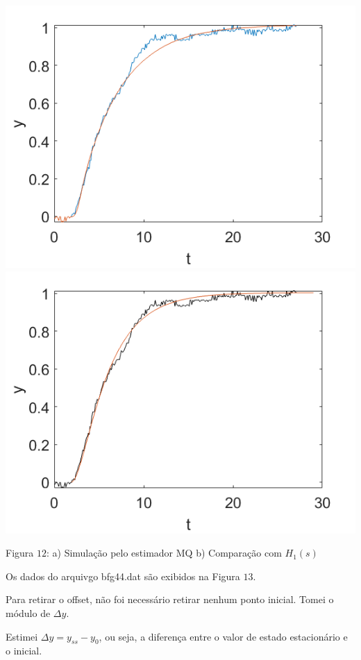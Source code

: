 \documentclass{rbfin}
\begin{document}
\begin{center}
\includegraphics[scale=0.5]{33_4}
\includegraphics[scale=0.5]{33_5}

Figura $12$: a) Simulação pelo estimador MQ b) Comparação com $H_1(s)$
\end{center}

\dotfill

\newpage

Os dados do arquivgo bfg44.dat são exibidos na Figura $13$.

Para retirar o offset, não foi necessário retirar nenhum ponto inicial. Tomei o módulo de $\Delta y$.

Estimei $\Delta y = y_{ss} - y_0$, ou seja, a diferença entre o valor de estado estacionário e o inicial.
\end{document}

